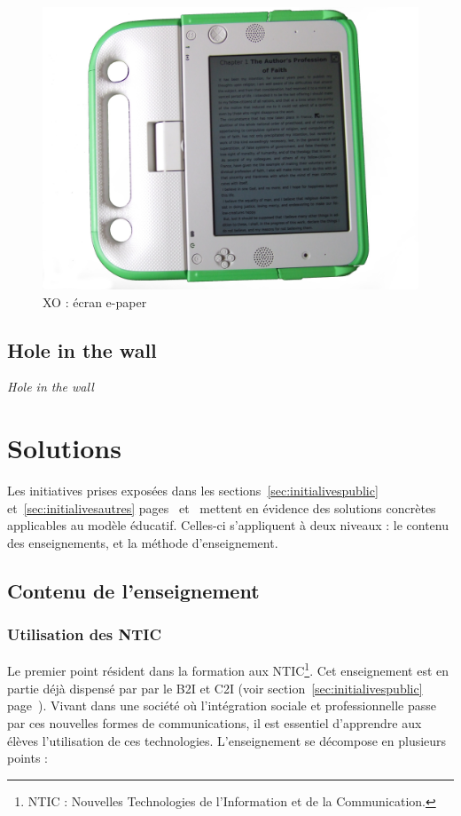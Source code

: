 \begin{minipage}{.5\linewidth}
  \begin{figure}[H]
    \includegraphics[width=\linewidth]{../resources/illustrations/olpc_display}
    \caption{XO : écran e-paper}
  \end{figure}
\end{minipage}

\section{Hole in the wall}
\textit{Hole in the wall}

\chapter{Solutions}
\label{sec:solutions}

Les initiatives prises exposées dans les sections~\ref{sec:initialivespublic} et~\ref{sec:initialivesautres} pages~\pageref{sec:initialivespublic} et~\pageref{sec:initialivespublic} mettent en évidence des solutions concrètes applicables au modèle éducatif. Celles-ci s'appliquent à deux niveaux : le contenu des enseignements, et la méthode d'enseignement.

\section{Contenu de l'enseignement}
\subsection{Utilisation des NTIC}
Le premier point résident dans la formation aux NTIC\footnote{NTIC : Nouvelles Technologies de l'Information et de la Communication.}. Cet enseignement est en partie déjà dispensé par par le B2I et C2I (voir section~\ref{sec:initialivespublic} page~\pageref{sec:initialivespublic}). Vivant dans une société où l'intégration sociale et professionnelle passe par ces nouvelles formes de communications, il est essentiel d'apprendre aux élèves l'utilisation de ces technologies. L'enseignement se décompose en plusieurs points :

